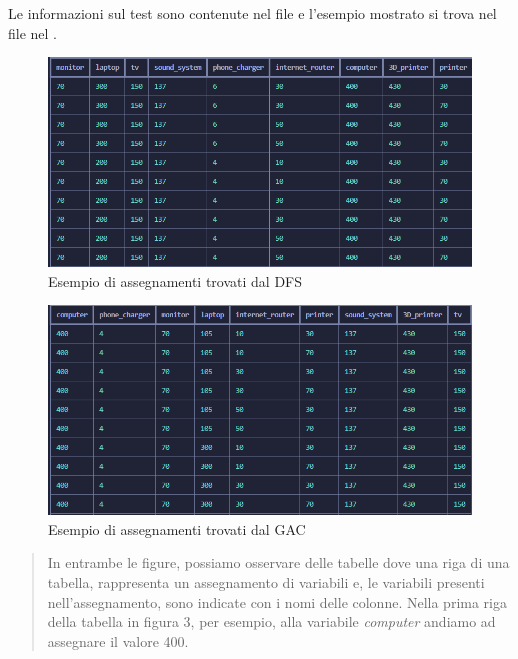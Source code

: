 \documentclass[12pt, letterpaper]{article}
\begin{document}
\noindent Le informazioni sul test sono contenute nel file  e
l'esempio mostrato si trova nel file nel . \\

\begin{figure}[h]
      \centering
      \includegraphics[scale=0.65]{assegnmanenti-dfs.png}
      \caption{Esempio di assegnamenti trovati dal DFS}
\end{figure}

\begin{figure}[h]
      \centering
      \includegraphics[scale=0.65]{assegnamenti-gac.png}
      \caption{Esempio di assegnamenti trovati dal GAC}
\end{figure}

\break

\begin{quote}
      In entrambe le figure, possiamo osservare delle tabelle dove una riga di una tabella, rappresenta un assegnamento
      di variabili e, le variabili presenti nell'assegnamento, sono indicate con i nomi delle colonne.
      Nella prima riga della tabella in figura 3, per esempio, alla variabile \textit{computer} andiamo ad assegnare
      il valore 400.
\end{quote}
\end{document}
